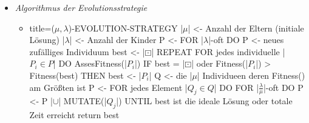 \documentclass[
    12pt,
    a4paper,
    ngerman,
    color=3b,%
    marginpar=false,
    colorback=false,
    leqno,
]{tudaexercise}
\begin{document}
\begin{itemize}
\begin{itemize}
                \item \textit{Algorithmus der Evolutionsstrategie}
                    \begin{itemize}
                        \item[]
                            \begin{ccode}[autogobble,escapeinside=||]{title={($\mu, \lambda$)-EVOLUTION-STRATEGY}}
                            |$\mu$| <- Anzahl der Eltern (initiale Lösung)
                            |$\lambda$| <- Anzahl der Kinder
                            P <- {}
                            FOR |$\lambda$|-oft DO
                                P <- {neues zufälliges Individuum}
                            best <- |$\boxdot$|
                            REPEAT
                                FOR jedes individuelle |$P_i \in P$| DO
                                    AssesFitness(|$P_i$|)
                                    IF best = |$\boxdot$| oder Fitness(|$P_i$|) > Fitness(best) THEN
                                        best <- |$P_i$|
                                Q <- die |$\mu$| Individueen deren Fitness() am Größten ist
                                P <- {}
                                FOR jedes Element |$Q_j \in Q$| DO
                                    FOR |$\frac{\lambda}{\mu}$|-oft DO
                                        P <- P |$\cup$| {MUTATE(|$Q_j$|)}
                            UNTIL best ist die ideale Lösung oder totale Zeit erreicht
                            return best
                            \end{ccode}
                    \end{itemize}
            \end{itemize}
    \end{itemize}

\pagebreak
\end{document}
